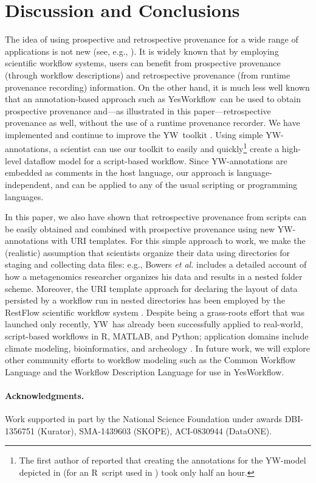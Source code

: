 \documentclass[letterpaper,twocolumn,10pt]{article}
\newcommand{\YW}{\textsf{YesWorkflow}}
\newcommand{\yw}{\textsf{YW}}
\newcommand{\R}{\textsf{R}}
\newcommand{\MATLAB}{\textsf{MATLAB}}
\begin{document}



\section{Discussion and Conclusions} 
\label{sec:discussion}

The idea of using prospective and retrospective provenance for a wide
range of applications is not new (see, e.g.,
\cite{zhao2006applying,missier2008data,frew2008automatic}).  It is
widely known that by employing scientific workflow systems, users can
benefit from prospective provenance (through workflow descriptions)
and retrospective provenance (from runtime provenance recording)
information. On the other hand, it is much less well known that an
annotation-based approach such as \YW\ can be used to obtain
prospective provenance and---as illustrated in this
paper---retrospective provenance as well, without the use of a runtime
provenance recorder.  We have implemented and continue to improve the
\yw\ toolkit \cite{mcphillips2015ywIJDC,yw-website}. Using simple
\yw-annotations, a scientist can use our toolkit to easily and
quickly\footnote{The first author of \cite{bocinsky2014} reported that
  creating the annotations for the \yw-model depicted in
  \cite{mcphillips2015ywIJDC} (for an \R\ script used in
  \cite{bocinsky2014}) took only half an hour.}  create a high-level
dataflow model for a script-based workflow.  Since \yw-annotations are
embedded as comments in the host language, our approach is
language-independent, and can be applied to any of the usual scripting
or programming languages.

In this paper, we also have shown that retrospective provenance from
scripts can be easily obtained and combined with prospective
provenance using new \yw-annotations with URI templates. For this
simple approach to work, we make the (realistic) assumption that
scientists organize their data using directories for staging and
collecting data files: e.g., Bowers \emph{et al.}
\cite{bowers2007project} includes a detailed account of how a
metagenomics researcher organizes his data and results in a nested
folder scheme. Moreover, the URI template approach for declaring the
layout of data persisted by a workflow run in nested directories has
been employed by the RestFlow scientific workflow system
\cite{tsai2013autodrug}.
Despite being a grass-roots effort that was launched only recently,
\yw\ has already been successfully applied to real-world, script-based
workflows in \R, \MATLAB, and Python; application domains include
climate modeling, bioinformatics, and archeology
\cite{mcphillips2015ywIJDC}.
In future work, we will explore other community efforts to workflow
modeling such as the Common Workflow Language \cite{amstutz15CDL} and
the Workflow Description Language \cite{frazer15WDL} for use in \YW.

\paragraph{Acknowledgments.}
Work supported in part by the National Science Foundation under awards
DBI-1356751 (Kurator), SMA-1439603 (SKOPE), ACI-0830944 (DataONE).



\footnotesize

\end{document}
